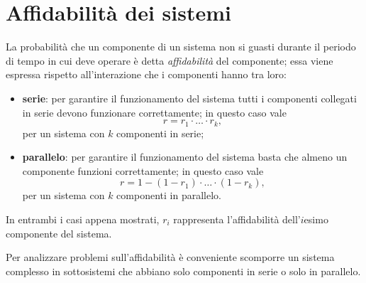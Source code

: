     \section{Affidabilità dei sistemi}
        \begin{defn}
            La probabilità che un componente di un sistema non si guasti durante il periodo di tempo in cui deve operare è detta \textit{affidabilità} del componente; essa viene espressa rispetto all'interazione che i componenti hanno tra loro:
            \begin{itemize}
                \item \textbf{serie}: per garantire il funzionamento del sistema tutti i componenti collegati in serie devono funzionare correttamente; in questo caso vale \[
                    r = r_1 \cdot \ldots \cdot r_k
                ,\] per un sistema con $k$ componenti in serie;
            \item \textbf{parallelo}: per garantire il funzionamento del sistema basta che almeno un componente funzioni correttamente; in questo caso vale \[
                        r = 1 - (1 - r_1) \cdot \ldots \cdot (1 - r_k)
                ,\] per un sistema con $k$ componenti in parallelo.
            \end{itemize}
            In entrambi i casi appena mostrati, $r_i$ rappresenta l'affidabilità dell'$i$\nbdash esimo componente del sistema.
        \end{defn}
        \begin{obsv}
            Per analizzare problemi sull'affidabilità è conveniente scomporre un sistema complesso in sottosistemi che abbiano solo componenti in serie o solo in parallelo.
        \end{obsv}
